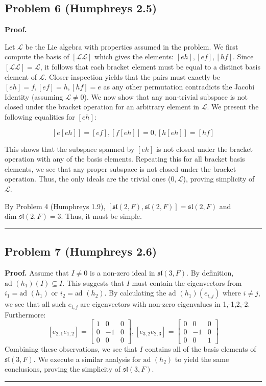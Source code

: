 \documentclass[12pt]{article}%
\newenvironment{proof}[1][Proof]{\textbf{#1.} }{\ \rule{0.5em}{0.5em}}
\begin{document}
  \subsection*{Problem 6 (Humphreys 2.5)}
    \begin{proof}

      Let $\mathcal{L}$ be the Lie algebra with properties assumed in the problem. We first compute the basis of $[\mathcal{L}\mathcal{L}]$ which gives the elements: $[eh],[ef],[hf]$. Since $[\mathcal{L}\mathcal{L}] = \mathcal{L}$, it follows that each bracket element must be equal to a distinct basis element of $\mathcal{L}$. Closer inspection yields that the pairs must exactly be $[eh] = f,[ef] = h,[hf] = e$ as any other permutation contradicts the Jacobi Identity (assuming $\mathcal{L} \neq 0$). We now show that any non-trivial subspace is not closed under the bracket operation for an arbitrary element in $\mathcal{L}$. We present the following equalities for $[eh]$:

      $$ [e[eh]] = [ef], [f[eh]] = 0, [h[eh]] = [hf] $$

      This shows that the subspace spanned by $[eh]$ is not closed under the bracket operation with any of the basis elements. Repeating this for all bracket basis elements, we see that any proper subspace is not closed under the bracket operation. Thus, the only ideals are the trivial ones ($0,\mathcal{L}$), proving simplicity of $\mathcal{L}$.

      By Problem 4 (Humphreys 1.9), $[\mathfrak{sl}(2,F),\mathfrak{sl}(2,F)] = \mathfrak{sl}(2,F)$ and $\text{dim }\mathfrak{sl}(2,F) = 3$. Thus, it must be simple.
    \end{proof}

  \subsection*{Problem 7 (Humphreys 2.6)}
    \begin{proof}
      Assume that $I \neq 0$ is a non-zero ideal in $\mathfrak{sl}(3,F)$. By definition, $\text{ad }(h_1)(I) \subseteq I$. This suggests that $I$ must contain the eigenvectors from $i_1 = \text{ad }(h_1)$ or $i_2 = \text{ad }(h_2)$. By calculating the $\text{ad }(h_1)(e_{i,j})$ where $i \neq j$, we see that all such $e_{i,j}$ are eigenvectors with non-zero eigenvalues in 1,-1,2,-2. Furthermore:
      $$[e_{2,1}e_{1,2}] = \left[ \begin{array}{ccc} 1 & 0 & 0 \\ 0 & -1 & 0 \\ 0 & 0 & 0\end{array} \right], [e_{3,2}e_{2,3}] = \left[ \begin{array}{ccc} 0 & 0 & 0 \\ 0 & -1 & 0 \\ 0 & 0 & 1 \end{array} \right]$$ Combining these observations, we see that $I$ contains all of the basis elements of $\mathfrak{sl}(3,F)$. We execute a similar analysis for $\text{ad }(h_2)$ to yield the same conclusions, proving the simplicity of $\mathfrak{sl}(3,F)$.
    \end{proof}
\end{document}
